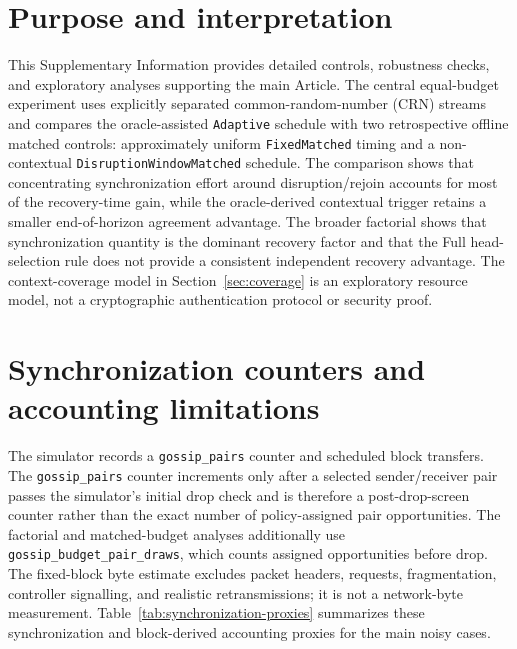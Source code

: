 \documentclass[11pt]{article}
\begin{document}
\section{Purpose and interpretation}
This Supplementary Information provides detailed controls, robustness checks, and exploratory analyses supporting the main Article. The central equal-budget experiment uses explicitly separated common-random-number (CRN) streams and compares the oracle-assisted \texttt{Adaptive} schedule with two retrospective offline matched controls: approximately uniform \texttt{FixedMatched} timing and a non-contextual \texttt{DisruptionWindowMatched} schedule. The comparison shows that concentrating synchronization effort around disruption/rejoin accounts for most of the recovery-time gain, while the oracle-derived contextual trigger retains a smaller end-of-horizon agreement advantage. The broader factorial shows that synchronization quantity is the dominant recovery factor and that the Full head-selection rule does not provide a consistent independent recovery advantage. The context-coverage model in Section~\ref{sec:coverage} is an exploratory resource model, not a cryptographic authentication protocol or security proof.

\section{Synchronization counters and accounting limitations}
The simulator records a \texttt{gossip\_pairs} counter and scheduled block transfers. The \texttt{gossip\_pairs} counter increments only after a selected sender/receiver pair passes the simulator's initial drop check and is therefore a post-drop-screen counter rather than the exact number of policy-assigned pair opportunities. The factorial and matched-budget analyses additionally use \texttt{gossip\_budget\_pair\_draws}, which counts assigned opportunities before drop. The fixed-block byte estimate excludes packet headers, requests, fragmentation, controller signalling, and realistic retransmissions; it is not a network-byte measurement. Table~\ref{tab:synchronization-proxies} summarizes these synchronization and block-derived accounting proxies for the main noisy cases.
\end{document}

